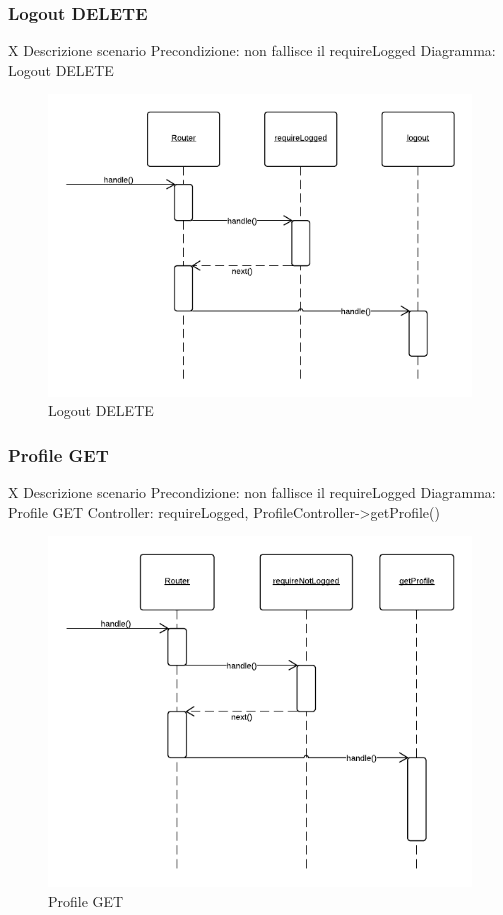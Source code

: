 \subsubsection{Logout DELETE} X
Descrizione scenario
Precondizione: non fallisce il requireLogged
Diagramma: Logout DELETE
\begin{figure}[H]
	\begin{center} 
		\includegraphics[scale=0.60]{scenari/logout DELETE.png} 
		\caption{Logout DELETE}
	\end{center} 
\end{figure}

\subsubsection{Profile GET} X
Descrizione scenario
Precondizione: non fallisce il requireLogged
Diagramma: Profile GET
Controller: requireLogged, ProfileController->getProfile() 
\begin{figure}[H]
	\begin{center} 
		\includegraphics[scale=0.60]{scenari/Profile GET.png} 
		\caption{Profile GET}
	\end{center} 
\end{figure}

